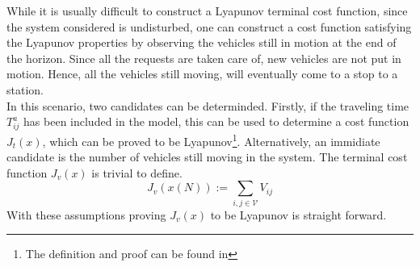 While it is usually difficult to construct a Lyapunov terminal cost function, since the system considered is undisturbed, one can construct a cost function satisfying the Lyapunov properties by observing the vehicles still in motion at the end of the horizon. Since all the requests are taken care of, new vehicles are not put in motion. Hence, all the vehicles still moving, will eventually come to a stop to a station. \\
In this scenario, two candidates can be determinded. Firstly, if the traveling time $T_{ij}^a$ has been included in the model, this can be used to determine a cost function $J_t(x)$, which can be proved to be Lyapunov\footnote{The definition and proof can be found in  }. Alternatively, an immidiate candidate is the number of vehicles still moving in the system. The terminal cost function $J_v(x)$ is trivial to define. \\
\begin{equation}
	 J_v(x(N)):= \sum_{i,j \in \mathcal{V}}V_{ij}\label{eq:cost_function_v}
\end{equation}
With these assumptions proving $J_v(x)$ to be Lyapunov is straight forward. \\

